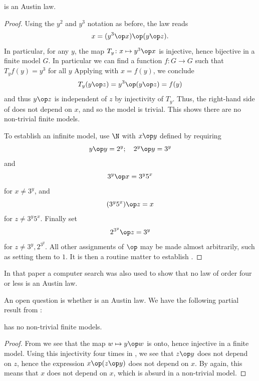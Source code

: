 \begin{theorem}\label{kis-thm2}\leanok {} is an Austin law.
\end{theorem}

\begin{proof} \leanok Using the $y^2$ and $y^3$ notation as before, the law reads
\begin{equation}\label{kis2-law}
   x = (y^3 \op x) \op (y \op z).
  \end{equation}
In particular, for any $y$, the map $T_y \colon x \mapsto y^3 \op x$ is injective, hence bijective in a finite model $G$.  In particular we can find a function $f : G \to G$ such that $T_y f(y) = y^3$ for all $y$  Applying  with $x = f(y)$, we conclude
$$ T_y(y \op z) = y^3 \op (y \op z) = f(y) $$
and thus $y \op z$ is independent of $z$ by injectivity of $T_y$.  Thus, the right-hand side of  does not depend on $x$, and so the model is trivial.  This shows there are no non-trivial finite models.

To establish an infinite model, use $\N$ with $x \op y$ defined by requiring
$$ y \op y = 2^y; \quad 2^y \op y = 3^y$$
and
$$ 3^y \op x = 3^y 5^x$$
for $x \neq 3^y$, and
$$ (3^y 5^x) \op z = x$$
for $z \neq 3^y 5^x$.  Finally set
$$ 2^{3^y} \op z = 3^y$$
for $z \neq 3^y, 2^{3^y}$.  All other assignments of $\op$ may be made almost arbitrarily, such as setting them to $1$. It is then a routine matter to establish .
\end{proof}

In that paper a computer search was also used to show that no law of order four or less is an Austin law.

An open question is whether  is an Austin law.  We have the following partial result from \cite{Kisielewicz2}:

\begin{theorem}\leanok\label{5093-nontrivial}  has no non-trivial finite models.
\end{theorem}

\begin{proof} \leanok From  we see that the map $w \mapsto y \op w$ is onto, hence injective in a finite model.  Using this injectivity four times in , we see that $z \op y$ does not depend on $z$, hence the expression
$x \op (z \op y)$ does not depend on $x$.  By  again, this means that $x$ does not depend on $x$, which is absurd in a non-trivial model.
\end{proof}

